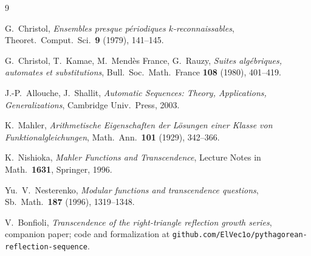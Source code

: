 \documentclass[11pt,a4paper]{article}
\theoremstyle{remark}
\theoremstyle{plain}
\begin{document}
\begin{thebibliography}{9}

 G.~Christol, \emph{Ensembles presque p\'eriodiques $k$-reconnaissables},
Theoret.\ Comput.\ Sci.\ \textbf{9} (1979), 141--145.

 G.~Christol, T.~Kamae, M.~Mend\`es France, G.~Rauzy,
\emph{Suites alg\'ebriques, automates et substitutions},
Bull.\ Soc.\ Math.\ France \textbf{108} (1980), 401--419.

 J.-P.~Allouche, J.~Shallit, \emph{Automatic Sequences: Theory,
Applications, Generalizations}, Cambridge Univ.\ Press, 2003.

 K.~Mahler, \emph{Arithmetische Eigenschaften der L\"osungen einer Klasse
von Funktionalgleichungen}, Math.\ Ann.\ \textbf{101} (1929), 342--366.

 K.~Nishioka, \emph{Mahler Functions and Transcendence},
Lecture Notes in Math.\ \textbf{1631}, Springer, 1996.

 Yu.~V.~Nesterenko, \emph{Modular functions and transcendence
questions}, Sb.\ Math.\ \textbf{187} (1996), 1319--1348.

 V.~Bonfioli, \emph{Transcendence of the right-triangle reflection growth
series}, companion paper; code and formalization at
\texttt{github.com/ElVec1o/pythagorean-reflection-sequence}.

\end{thebibliography}
\end{document}
